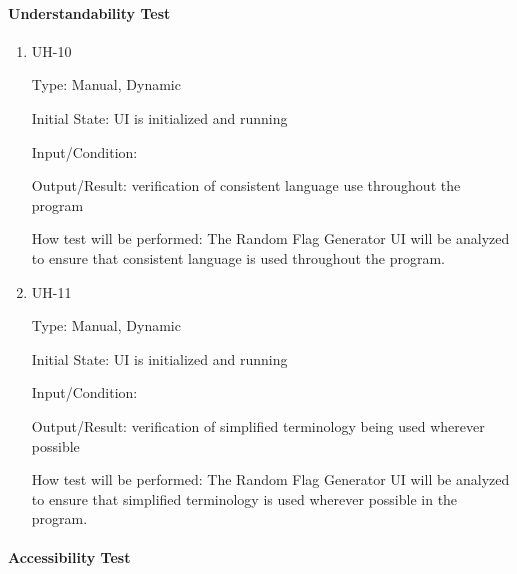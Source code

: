\documentclass[12pt, titlepage]{article}
\begin{document}
\paragraph{Understandability Test}

\begin{enumerate}

\item{UH-10\\}

Type: Manual, Dynamic

Initial State: UI is initialized and running

Input/Condition: 

Output/Result: verification of consistent language use throughout the program

How test will be performed: The Random Flag Generator UI will be analyzed to
ensure that consistent language is used throughout the program.

\item{UH-11\\}

Type: Manual, Dynamic

Initial State: UI is initialized and running

Input/Condition: 

Output/Result: verification of simplified terminology being used wherever
possible

How test will be performed: The Random Flag Generator UI will be analyzed to
ensure that simplified terminology is used wherever possible in the program.

\end{enumerate}

\paragraph{Accessibility Test}
\end{document}
